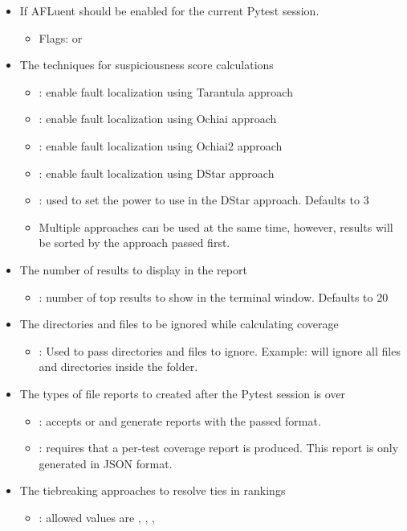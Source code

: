 \begin{itemize}
    \item If AFLuent should be enabled for the current Pytest session.
    \begin{itemize}
        \item Flags:  or 
    \end{itemize}
    \item The techniques for suspiciousness score calculations
    \begin{itemize}
        \item {}: enable fault localization using Tarantula approach
        \item {}: enable fault localization using Ochiai approach
        \item {}: enable fault localization using Ochiai2 approach
        \item {}: enable fault localization using DStar approach
        \item {}: used to set the power to use in the DStar
        approach. Defaults to 3
        \item Multiple approaches can be used at the same time, however, results
        will be sorted by the approach passed first.
    \end{itemize}
    \item The number of results to display in the report
    \begin{itemize}
        \item {}: number of top results to show in the
        terminal window. Defaults to 20
    \end{itemize}
    \item The directories and files to be ignored while calculating coverage
    \begin{itemize}
        \item {}: Used to pass directories and files to
        ignore. Example:  will ignore all files and directories
        inside the  folder.
    \end{itemize}
    \item The types of file reports to created after the Pytest session is over
    \begin{itemize}
        \item {}: accepts  or  and generate
        reports with the passed format.
        \item {}: requires that a per-test coverage
        report is produced. This report is only generated in JSON format.
    \end{itemize}
    \item The tiebreaking approaches to resolve ties in rankings
    \begin{itemize}
        \item {}: allowed values are ,
        , ,


\end{itemize}
\end{itemize}
